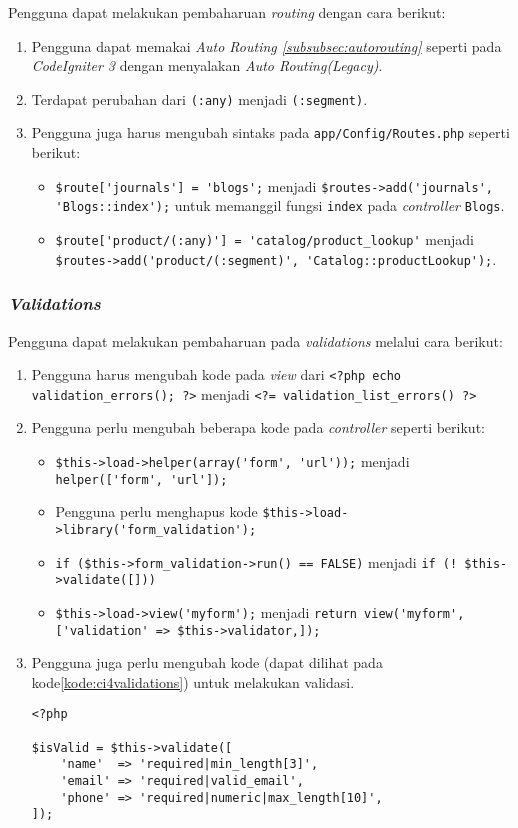 Pengguna dapat melakukan pembaharuan \textit{routing} dengan cara berikut:
\begin{enumerate}
\item Pengguna dapat memakai \textit{Auto Routing \ref{subsubsec:autorouting}} seperti pada \textit{CodeIgniter 3} dengan menyalakan \textit{Auto Routing(Legacy)}.
\item Terdapat perubahan dari \verb|(:any)| menjadi \verb|(:segment)|.
\item Pengguna juga harus mengubah sintaks pada \verb|app/Config/Routes.php| seperti berikut:
	\begin{itemize}
	\item \verb|$route['journals'] = 'blogs';| menjadi \verb|$routes->add('journals', 'Blogs::index');| untuk memanggil fungsi \texttt{index} pada \textit{controller} \texttt{Blogs}.
	\item \verb|$route['product/(:any)'] = 'catalog/product_lookup'| menjadi \verb|$routes->add('product/(:segment)', 'Catalog::productLookup');|.
	\end{itemize}
\end{enumerate}

\subsubsection{\textit{Validations}}
Pengguna dapat melakukan pembaharuan pada \textit{validations} melalui cara berikut:
\begin{enumerate}
\item Pengguna harus mengubah kode pada \textit{view} dari \verb|<?php echo validation_errors(); ?>| menjadi \verb|<?= validation_list_errors() ?>|
\item Pengguna perlu mengubah beberapa kode pada \textit{controller} seperti berikut:
	\begin{itemize}
		\item \verb|$this->load->helper(array('form', 'url'));| menjadi \verb|helper(['form', 'url']);|
		\item Pengguna perlu menghapus kode \verb|$this->load->library('form_validation');|
		\item \verb|if ($this->form_validation->run() == FALSE)| menjadi \verb|if (! $this->validate([]))|
		\item \verb|$this->load->view('myform');| menjadi \verb|return view('myform', ['validation' => $this->validator,]);|
	\end{itemize}
	\item Pengguna juga perlu mengubah kode (dapat dilihat pada kode\ref{kode:ci4validations}) untuk melakukan validasi.
	\begin{lstlisting}[caption=Perubahan kode untuk melakukan validasi. ,label=kode:ci4validations]
<?php

$isValid = $this->validate([
    'name'  => 'required|min_length[3]',
    'email' => 'required|valid_email',
    'phone' => 'required|numeric|max_length[10]',
]);
\end{lstlisting}
\end{enumerate}

